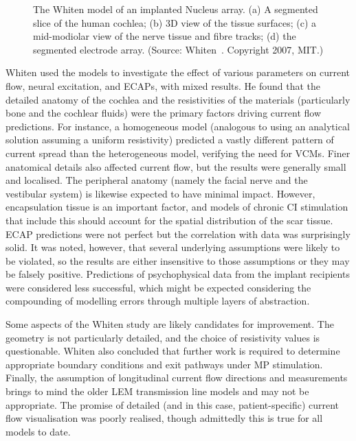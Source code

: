 \begin{figure}
	\caption[The Whiten model]{The Whiten model of an implanted Nucleus array. (a)
	A segmented slice of the human cochlea; (b) 3D view of the tissue surfaces; (c)
	a mid-modiolar view of the nerve tissue and fibre tracks; (d) the segmented
	electrode array. (Source: Whiten~\cite{whiten2007}. Copyright
	\textcopyright{} 2007, MIT.)}
	\label{fig:model_whiten}
\end{figure}

Whiten used the models to investigate the effect of various parameters on
current flow, neural excitation, and ECAPs, with mixed results. He found that
the detailed anatomy of the cochlea and the resistivities of the materials
(particularly bone and the cochlear fluids) were the primary factors driving
\insilico{} current flow predictions. For instance, a homogeneous model
(analogous to using an analytical solution assuming a uniform resistivity)
predicted a vastly different pattern of current spread than the heterogeneous
model, verifying the need for VCMs. Finer anatomical details also affected
current flow, but the results were generally small and localised. The peripheral
anatomy (namely the facial nerve and the vestibular system) is likewise expected
to have minimal impact. However, encapsulation tissue is an important factor,
and models of chronic CI stimulation that include this should account for the
spatial distribution of the scar tissue. ECAP predictions were not perfect but
the correlation with \invivo{} data was surprisingly solid. It was noted,
however, that several underlying assumptions were likely to be violated, so the
results are either insensitive to those assumptions or they may be falsely
positive. Predictions of psychophysical data from the implant recipients were
considered less successful, which might be expected considering the compounding
of modelling errors through multiple layers of abstraction.

Some aspects of the Whiten study are likely candidates for improvement. The
geometry is not particularly detailed, and the choice of resistivity values is
questionable. Whiten also concluded that further work is required to determine
appropriate boundary conditions and exit pathways under MP stimulation. Finally,
the assumption of longitudinal current flow directions and measurements brings
to mind the older LEM transmission line models and may not be appropriate. The
promise of detailed (and in this case, patient-specific) current flow
visualisation was poorly realised, though admittedly this is true for all models
to date.

